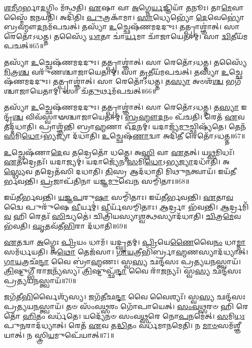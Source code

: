 \-\ul{𑌶}\-\-\ul{𑌮𑍀}\-\-\ul{𑌗}\-𑌰𑍍𑌭𑌾\-\ul{𑌦}\-𑌗𑍍𑌨𑌿𑌂 𑌮᳴𑌨𑍍𑌥𑌤𑌿।
\-\ul{𑌏}\-𑌷𑌾 𑌵𑌾 \ul{𑌅}\-𑌗𑍍𑌨𑍇\-\ul{𑌰𑍍𑌯}\-𑌜𑍍𑌞𑌿𑌯𑌾᳴ \ul{𑌤}\-𑌨𑍂𑌃।
𑌤𑌾\-\ul{𑌮𑍇}\-𑌵𑌾𑌸𑍍𑌮𑍈᳴ 𑌜𑌨𑌯𑌤𑌿।
𑌅𑌦𑌿᳴𑌤𑌿𑌃 \ul{𑌪𑍁}\-𑌤𑍍𑌰𑌕𑌾᳴𑌮𑌾।
\-\ul{𑌸𑌾}\-𑌧𑍍𑌯𑍇𑌭𑍍𑌯𑍋᳴ \ul{𑌦𑍇}\-𑌵𑍇𑌭𑍍𑌯𑍋॑ 𑌬𑍍𑌰𑌹𑍍𑌮𑍗\-\ul{𑌦}\-𑌨𑌮᳴𑌪𑌚𑌤𑍍।
𑌤𑌸𑍍𑌯𑌾᳴ \ul{𑌉}\-𑌚𑍍𑌛𑍇𑌷᳴𑌣𑌮𑌦𑌦𑍁𑌃।
𑌤𑌤𑍍𑌪𑍍𑌰𑌾𑌶𑍍𑌞𑌾॑𑌤𑍍।
𑌸𑌾 𑌰𑍇𑌤𑍋᳴\-𑌽𑌧𑌤𑍍𑌤।
𑌤𑌸𑍍𑌯𑍈᳴ \ul{𑌧𑌾}\-𑌤𑌾 𑌚𑌾॑\-\ul{𑌰𑍍𑌯}\-𑌮𑌾 𑌚𑌾᳴𑌜𑌾𑌯𑍇𑌤𑌾𑌮𑍍।
𑌸𑌾 \ul{𑌦𑍍𑌵𑌿}\-𑌤𑍀𑌯᳴𑌮𑌪𑌚𑌤𑍍॥65॥

𑌤𑌸𑍍𑌯𑌾᳴ \ul{𑌉}\-𑌚𑍍𑌛𑍇𑌷᳴𑌣𑌮𑌦𑌦𑍁𑌃।
𑌤𑌤𑍍𑌪𑍍𑌰𑌾𑌶𑍍𑌞𑌾॑𑌤𑍍।
𑌸𑌾 𑌰𑍇𑌤𑍋᳴\-𑌽𑌧𑌤𑍍𑌤।
𑌤𑌸𑍍𑌯𑍈᳴ \ul{𑌮𑌿}\-𑌤𑍍𑌰\-\ul{𑌶𑍍𑌚} 𑌵𑌰𑍁᳴𑌣𑌶𑍍𑌚𑌾𑌜𑌾𑌯𑍇𑌤𑌾𑌮𑍍।
𑌸𑌾 \ul{𑌤𑍃}\-𑌤𑍀𑌯᳴𑌮𑌪𑌚𑌤𑍍।
𑌤𑌸𑍍𑌯𑌾᳴ \ul{𑌉}\-𑌚𑍍𑌛𑍇𑌷᳴𑌣𑌮𑌦𑌦𑍁𑌃।
𑌤𑌤𑍍𑌪𑍍𑌰𑌾𑌶𑍍𑌞𑌾॑𑌤𑍍।
𑌸𑌾 𑌰𑍇𑌤𑍋᳴\-𑌽𑌧𑌤𑍍𑌤।
𑌤\-\ul{𑌸𑍍𑌯𑌾} 𑌅𑍞𑌶᳴\-\ul{𑌶𑍍𑌚} 𑌭𑌗᳴𑌶𑍍𑌚𑌾𑌜𑌾𑌯𑍇𑌤𑌾𑌮𑍍।
𑌸𑌾 𑌚᳴\-\ul{𑌤𑍁}\-𑌰𑍍𑌥𑌮᳴𑌪𑌚𑌤𑍍॥66॥

𑌤𑌸𑍍𑌯𑌾᳴ \ul{𑌉}\-𑌚𑍍𑌛𑍇𑌷᳴𑌣𑌮𑌦𑌦𑍁𑌃।
𑌤𑌤𑍍𑌪𑍍𑌰𑌾𑌶𑍍𑌞𑌾॑𑌤𑍍।
𑌸𑌾 𑌰𑍇𑌤𑍋᳴\-𑌽𑌧𑌤𑍍𑌤।
𑌤\-\ul{𑌸𑍍𑌯𑌾} 𑌇𑌨𑍍𑌦𑍍𑌰᳴\-\ul{𑌶𑍍𑌚} 𑌵𑌿𑌵᳴𑌸𑍍𑌵𑌾𑍟𑌶𑍍𑌚𑌾𑌜𑌾𑌯𑍇𑌤𑌾𑌮𑍍।
\-\ul{𑌬𑍍𑌰}\-\-\ul{𑌹𑍍𑌮𑍗}\-\-\ul{𑌦}\-𑌨𑌂 𑌪᳴𑌚𑌤𑌿।
𑌰𑍇𑌤᳴ \ul{𑌏}\-𑌵 𑌤𑌦𑍍𑌦᳴𑌧𑌾𑌤𑌿।
𑌪𑍍𑌰𑌾𑌶𑍍𑌞᳴𑌨𑍍𑌤𑌿 𑌬𑍍𑌰𑌾\-\ul{𑌹𑍍𑌮}\-𑌣𑌾 𑌓᳴\-\ul{𑌦}\-𑌨𑌮𑍍।
𑌯𑌦𑌾𑌜𑍍𑌯᳴\-\ul{𑌮𑍁}\-𑌚𑍍𑌛𑌿𑌷𑍍𑌯᳴𑌤𑍇।
𑌤𑍇𑌨᳴ \ul{𑌸}\-𑌮𑌿\-\ul{𑌧𑍋}\-\-𑌽𑌭𑍍𑌯𑌜𑍍𑌯𑌾 𑌦᳴𑌧𑌾𑌤𑌿।
\-\ul{𑌉}\-𑌚𑍍𑌛𑍇𑌷᳴\-\ul{𑌣𑌾}\-𑌦𑍍𑌵𑌾 𑌅𑌦𑌿᳴\-\ul{𑌤𑍀} 𑌰𑍇𑌤𑍋᳴\-𑌽𑌧𑌤𑍍𑌤॥67॥

\-\ul{𑌉}\-𑌚𑍍𑌛𑍇𑌷᳴𑌣𑌾\-\ul{𑌦𑍇}\-𑌵 𑌤𑌦𑍍𑌰𑍇𑌤𑍋᳴ 𑌧𑌤𑍍𑌤𑍇।
𑌅\-\ul{𑌸𑍍𑌥𑌿} 𑌵𑌾 \ul{𑌏}\-𑌤𑌤𑍍।
𑌯\-\ul{𑌥𑍍𑌸}\-𑌮𑌿𑌧𑌃᳴।
\-\ul{𑌏}\-𑌤𑌦𑍍𑌰𑍇𑌤𑌃᳴।
𑌯𑌦𑌾𑌜𑍍𑌯𑌮𑍍॑।
𑌯𑌦𑌾𑌜𑍍𑌯𑍇᳴𑌨 \ul{𑌸}\-𑌮𑌿\-\ul{𑌧𑍋}\-\-𑌽𑌭𑍍𑌯\-\ul{𑌜𑍍𑌯𑌾}\-𑌦𑌧𑌾᳴𑌤𑌿।
𑌅\-\ul{𑌸𑍍𑌥𑍍𑌯𑍇}\-𑌵 𑌤𑌦𑍍𑌰𑍇𑌤᳴𑌸𑌿 𑌦𑌧𑌾𑌤𑌿।
\-\ul{𑌤𑌿}\-𑌸𑍍𑌰 𑌆𑌦᳴𑌧𑌾𑌤𑌿 𑌮𑌿𑌥𑍁\-\ul{𑌨}\-𑌤𑍍𑌵𑌾𑌯᳴।
𑌇𑌯᳴𑌤𑍀𑌰𑍍𑌭𑌵𑌨𑍍𑌤𑌿।
\-\ul{𑌪𑍍𑌰}\-𑌜𑌾𑌪᳴𑌤𑌿𑌨𑌾 𑌯𑌜𑍍𑌞\-\ul{𑌮𑍁}\-𑌖𑍇\-\ul{𑌨} 𑌸𑌮𑍍𑌮𑌿᳴𑌤𑌾𑌃॥68॥

𑌇𑌯᳴𑌤𑍀𑌰𑍍𑌭𑌵𑌨𑍍𑌤𑌿।
\-\ul{𑌯}\-\-\ul{𑌜𑍍𑌞}\-\-\ul{𑌪}\-𑌰𑍁\-\ul{𑌷𑌾} 𑌸𑌮𑍍𑌮𑌿᳴𑌤𑌾𑌃।
𑌇𑌯᳴𑌤𑍀𑌰𑍍𑌭𑌵𑌨𑍍𑌤𑌿।
\-\ul{𑌏}\-𑌤𑌾\-\ul{𑌵}\-𑌦𑍍𑌵𑍈 𑌪𑍁𑌰𑍁᳴𑌷𑍇 \ul{𑌵𑍀}\-𑌰𑍍𑌯𑌮𑍍॑।
\-\ul{𑌵𑍀}\-𑌰𑍍𑌯᳴𑌸𑌮𑍍𑌮𑌿𑌤𑌾𑌃।
\-\ul{𑌆}\-𑌰𑍍𑌦𑍍𑌰𑌾 𑌭᳴𑌵𑌨𑍍𑌤𑌿।
\-\ul{𑌆}\-𑌰𑍍𑌦𑍍𑌰𑌮𑌿᳴\-\ul{𑌵} 𑌹𑌿 𑌰𑍇𑌤𑌃᳴ \ul{𑌸𑌿}\-𑌚𑍍𑌯𑌤𑍇॑।
𑌚𑌿𑌤𑍍𑌰𑌿᳴𑌯𑌸𑍍𑌯𑌾\-\ul{𑌶𑍍𑌵}\-𑌤𑍍𑌥𑌸𑍍𑌯𑌾𑌦᳴𑌧𑌾𑌤𑌿।
\-\ul{𑌚𑌿}\-𑌤𑍍𑌰\-\ul{𑌮𑍇}\-𑌵 𑌭᳴𑌵𑌤𑌿।
\-\ul{𑌘𑍃}\-𑌤𑌵᳴𑌤𑍀\-\ul{𑌭𑌿}\-𑌰𑌾 𑌦᳴𑌧𑌾𑌤𑌿॥69॥

\-\ul{𑌏}\-𑌤𑌦𑍍𑌵𑌾 \ul{𑌅}\-𑌗𑍍𑌨𑍇𑌃 \ul{𑌪𑍍𑌰𑌿}\-𑌯𑌂 𑌧𑌾𑌮᳴।
𑌯𑌦𑍍\mbox{}\-\ul{𑌘𑍃}\-𑌤𑌮𑍍।
\-\ul{𑌪𑍍𑌰𑌿}\-𑌯𑍇\-\ul{𑌣𑍈}\-𑌵𑍈\-\ul{𑌨𑌂} 𑌧𑌾\-\ul{𑌮𑍍𑌨𑌾} 𑌸𑌮᳴𑌰𑍍𑌧𑌯𑌤𑌿।
𑌅\-\ul{𑌥𑍋} 𑌤𑍇𑌜᳴𑌸𑌾।
\-\ul{𑌗𑌾}\-\-\ul{𑌯}\-𑌤𑍍𑌰𑍀𑌭𑌿᳴𑌰𑍍𑌬𑍍𑌰𑌾\-\ul{𑌹𑍍𑌮}\-𑌣𑌸𑍍𑌯𑌾𑌦᳴𑌧𑍍𑌯𑌾𑌤𑍍।
\-\ul{𑌗𑌾}\-\-\ul{𑌯}\-𑌤𑍍𑌰𑌛᳴\-\ul{𑌨𑍍𑌦𑌾} 𑌵𑍈 𑌬𑍍𑌰𑌾॑\-\ul{𑌹𑍍𑌮}\-𑌣𑌃।
𑌸𑍍𑌵\-\ul{𑌸𑍍𑌯} 𑌛𑌨𑍍𑌦᳴𑌸𑌃 𑌪𑍍𑌰𑌤𑍍𑌯𑌯\-\ul{𑌨}\-𑌸𑍍𑌤𑍍𑌵𑌾𑌯᳴।
\-\ul{𑌤𑍍𑌰𑌿}\-𑌷𑍍𑌟𑍁𑌗𑍍𑌭𑍀᳴ 𑌰𑌾\-\ul{𑌜}\-𑌨𑍍𑌯᳴𑌸𑍍𑌯।
\-\ul{𑌤𑍍𑌰𑌿}\-𑌷𑍍𑌟𑍁𑌪𑍍𑌛᳴\-\ul{𑌨𑍍𑌦𑌾} 𑌵𑍈 𑌰𑌾᳴\-\ul{𑌜}\-𑌨𑍍𑌯𑌃᳴।
𑌸𑍍𑌵\-\ul{𑌸𑍍𑌯} 𑌛𑌨𑍍𑌦᳴𑌸𑌃 𑌪𑍍𑌰𑌤𑍍𑌯𑌯\-\ul{𑌨}\-𑌸𑍍𑌤𑍍𑌵𑌾𑌯᳴॥70॥

𑌜𑌗᳴𑌤𑍀\-\ul{𑌭𑌿}\-𑌰𑍍𑌵𑍈𑌶𑍍𑌯᳴𑌸𑍍𑌯।
𑌜𑌗᳴𑌤𑍀𑌛\-\ul{𑌨𑍍𑌦𑌾} 𑌵𑍈 𑌵𑍈𑌶𑍍𑌯𑌃᳴।
𑌸𑍍𑌵\-\ul{𑌸𑍍𑌯} 𑌛𑌨𑍍𑌦᳴𑌸𑌃 𑌪𑍍𑌰𑌤𑍍𑌯𑌯\-\ul{𑌨}\-𑌸𑍍𑌤𑍍𑌵𑌾𑌯᳴।
𑌤𑍞 𑌸𑌂᳴𑌵\-\ul{𑌥𑍍𑌸}\-𑌰𑌂 𑌗𑍋᳴𑌪𑌾𑌯𑍇𑌤𑍍।
\-\ul{𑌸𑌂}\-\-\ul{𑌵}\-\-\ul{𑌥𑍍𑌸}\-𑌰𑍞 𑌹𑌿 𑌰𑍇𑌤𑍋᳴ \ul{𑌹𑌿}\-𑌤𑌂 𑌵𑌰𑍍𑌧᳴𑌤𑍇।
𑌯𑌦𑍍𑌯𑍇᳴𑌨𑍞 𑌸𑌂𑌵\-\ul{𑌥𑍍𑌸}\-𑌰𑍇 𑌨𑍋\-\ul{𑌪}\-𑌨𑌮𑍇॑𑌤𑍍।
\-\ul{𑌸}\-𑌮𑌿\-\ul{𑌧𑌃} 𑌪𑍁\-\ul{𑌨}\-𑌰𑌾𑌦᳴𑌧𑍍𑌯𑌾𑌤𑍍।
𑌰𑍇𑌤᳴ \ul{𑌏}\-𑌵 𑌤\-\ul{𑌦𑍍𑌧𑌿}\-𑌤𑌂 𑌵𑌰𑍍𑌧᳴𑌮𑌾𑌨𑌮𑍇𑌤𑌿।
𑌨 \ul{𑌮𑌾}\-\-\ul{𑍞}\-𑌸𑌮᳴𑌶𑍍𑌞𑍀𑌯𑌾𑌤𑍍।
𑌨 𑌸𑍍𑌤𑍍𑌰𑌿\-\ul{𑌯}\-𑌮𑍁𑌪𑍇᳴𑌯𑌾𑌤𑍍॥71॥

